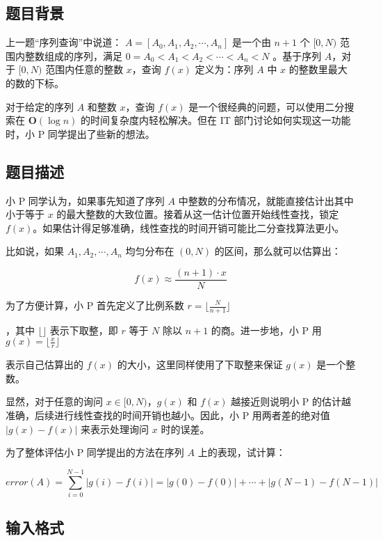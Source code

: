 \subsection*{题目背景}

上一题“序列查询”中说道：
$A=[A_0,A_1,A_2,\cdots,A_n]$ 是一个由 $n+1$ 个 $[0,N)$ 范围内整数组成的序列，满足 $0 = A_0 < A_1 < A_2 < \cdots < A_n < N$
。基于序列 $A$，对于 $[0,N)$ 范围内任意的整数 $x$，查询 $f(x)$ 定义为：序列 $A$ 中{} $x$ 的整数里最大的数的下标。

对于给定的序列 $A$ 和整数 $x$，查询 $f(x)$ 是一个很经典的问题，可以使用二分搜索在 $\mathbf{O}(\log n)$ 的时间复杂度内轻松解决。但在 IT 部门讨论如何实现这一功能时，小 P 同学提出了些新的想法。

\subsection*{题目描述}

小 P 同学认为，如果事先知道了序列 $A$ 中整数的分布情况，就能直接估计出其中小于等于 $x$ 的最大整数的大致位置。接着从这一估计位置开始线性查找，锁定 $f(x)$。如果估计得足够准确，线性查找的时间开销可能比二分查找算法更小。

比如说，如果 $A_1,A_2,\cdots,A_n$
 均匀分布在 $(0,N)$ 的区间，那么就可以估算出：
 
\begin{equation*}
    f(x)\approx \frac{(n+1)\cdot x}{N}
\end{equation*}

为了方便计算，小 P 首先定义了比例系数 $r=\lfloor \frac{N}{n+1} \rfloor$
 
，其中 $\lfloor \rfloor$ 表示下取整，即 $r$ 等于 $N$ 除以 $n+1$ 的商。进一步地，小 P 用 $g(x)=\lfloor \frac{x}{r}\rfloor$
 
 表示自己估算出的 $f(x)$ 的大小，这里同样使用了下取整来保证 $g(x)$ 是一个整数。

显然，对于任意的询问 $x\in [0,N)$，$g(x)$ 和 $f(x)$ 越接近则说明小 P 的估计越准确，后续进行线性查找的时间开销也越小。因此，小 P 用两者差的绝对值 $|g(x)-f(x)|$ 来表示处理询问 $x$ 时的误差。

为了整体评估小 P 同学提出的方法在序列 $A$ 上的表现，试计算：
 
\begin{equation*}
    error(A)=\sum\limits_{i=0}^{N-1}{|g(i)-f(i)|}=|g(0)-f(0)| + \cdots + |g(N-1)-f(N-1)|
\end{equation*}

\subsection*{输入格式}

